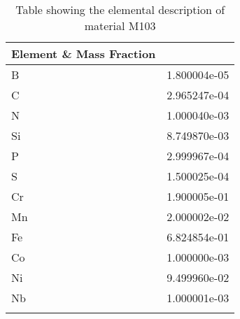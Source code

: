 \begin{centering}
\begin{longtable}[ht!]
{ p{} | p{} }
\hline
Element \& Mass Fraction\\
\hline
B &  1.800004e-05\\
C &  2.965247e-04\\
N &  1.000040e-03\\
Si &  8.749870e-03\\
P &  2.999967e-04\\
S &  1.500025e-04\\
Cr &  1.900005e-01\\
Mn &  2.000002e-02\\
Fe &  6.824854e-01\\
Co &  1.000000e-03\\
Ni &  9.499960e-02\\
Nb &  1.000001e-03\\

\caption{Table showing the elemental description of material M103}
\label{table:material_M103}
\end{longtable}
\clearpage


\end{centering}
